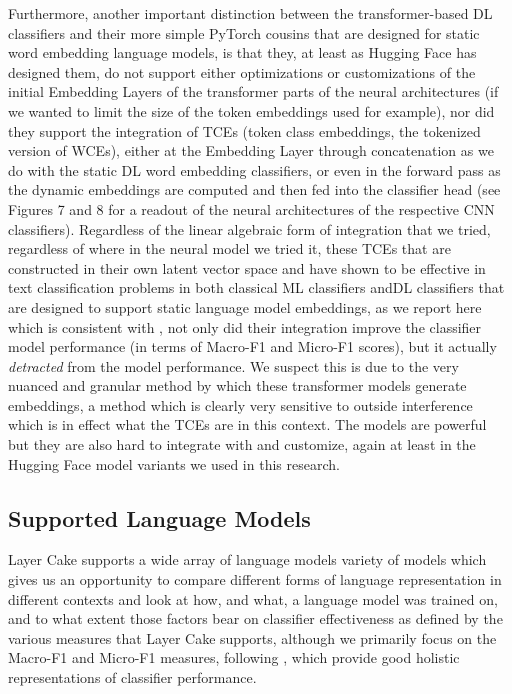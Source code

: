 \documentclass[final]{clv2025}
\begin{document}
Furthermore, another important distinction between the transformer-based DL classifiers and their more simple PyTorch cousins that are designed for static word embedding language models, is that they, at least as Hugging Face has designed them, do not support either optimizations or customizations of the initial Embedding Layers of the transformer parts of the neural architectures (if we wanted to limit the size of the token embeddings used for example), nor did they support the integration of TCEs (token class embeddings, the tokenized version of WCEs), either at the Embedding Layer through concatenation as we do with the static DL word embedding classifiers, or even in the forward pass as the dynamic embeddings are computed and then fed into the classifier head (see Figures 7 and 8 for a readout of the neural architectures of the respective CNN classifiers). Regardless of the linear algebraic form of integration that we tried, regardless of where in the neural model we tried it, these TCEs that are constructed in their own latent vector space and have shown to be effective in text classification problems in both classical ML classifiers andDL classifiers that are designed to support static language model embeddings, as we report here which is consistent with \cite{moreo}, not only did their integration  improve the classifier model performance (in terms of Macro-F1 and Micro-F1 scores), but it actually \textit{detracted} from the model performance. We suspect this is due to the very nuanced and granular method by which these transformer models generate embeddings, a method which is clearly very sensitive to outside interference which is in effect what the TCEs are in this context. The models are powerful but they are also hard to integrate with and customize, again at least in the Hugging Face model variants we used in this research.

\subsection{Supported Language Models}

Layer Cake supports a wide array of language models variety of models which gives us an opportunity to compare different forms of language representation in different contexts and look at how, and what, a language model was trained on, and to what extent those factors bear on classifier effectiveness as defined by the various measures that Layer Cake supports, although we primarily focus on the Macro-F1 and Micro-F1 measures, following \cite{moreo}, which provide good holistic representations of classifier performance.
\end{document}
